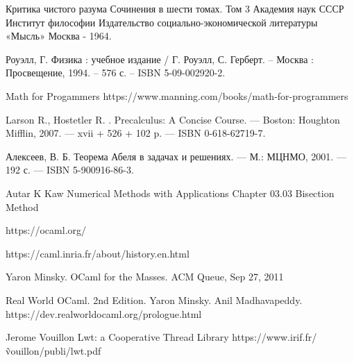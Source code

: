 \begingroup
\renewcommand{\section}[2]{\Anonchapter{Список использованных источников}}
\begin{thebibliography}{00}

    Критика чистого разума
    Сочинения в шести томах.
    Том 3
    Академия наук СССР
    Институт философии
    Издательство социально-экономической литературы
    «Мысль»
    Москва - 1964. \TODO

    Роуэлл, Г. Физика : учебное издание / Г. Роуэлл, С. Герберт. -- Москва : Просвещение, 1994. -- 576 с. -- ISBN 5-09-002920-2.

    Math for Progammers \TODO
    https://www.manning.com/books/math-for-programmers

    Larson R., Hostetler R. . Precalculus: A Concise Course. — Boston:
    Houghton Mifflin, 2007. — xvii + 526 + 102 p. — ISBN 0-618-62719-7. \TODO

    Алексеев, В. Б. Теорема Абеля в задачах и решениях. — М.: МЦНМО, 2001. — 192 с. — ISBN 5-900916-86-3. \TODO

    \TODO Autar K Kaw Numerical Methods with Applications Chapter 03.03 Bisection Method

    https://ocaml.org/ \TODO

    https://caml.inria.fr/about/history.en.html \TODO

    Yaron Minsky. OCaml for the Masses. ACM Queue, Sep 27, 2011 \TODO

    Real World OCaml. 2nd Edition. Yaron Minsky. Anil Madhavapeddy.
    https://dev.realworldocaml.org/prologue.html \TODO

    Jerome Vouillon Lwt: a Cooperative Thread Library \TODO
    https://www.irif.fr/\~vouillon/publi/lwt.pdf

\end{thebibliography}
\endgroup

\clearpage
